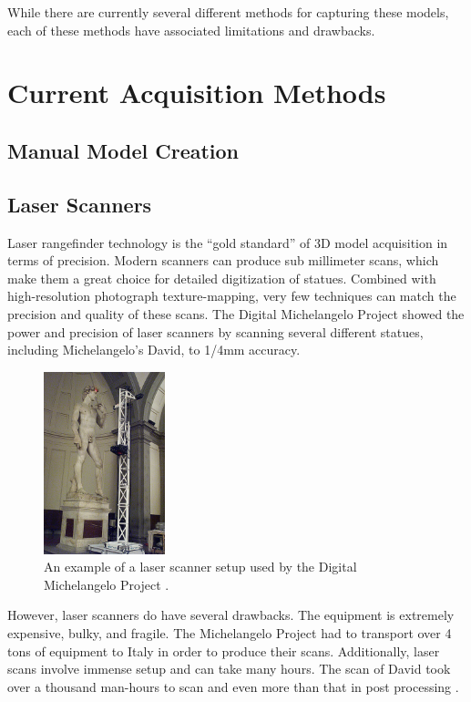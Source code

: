 While there are currently several different methods for capturing these models, each of these methods have associated limitations and drawbacks.


\section{Current Acquisition Methods}

\subsection{Manual Model Creation}

\subsection{Laser Scanners}
Laser rangefinder technology is the ``gold standard'' of 3D model acquisition in terms of precision. Modern scanners can produce sub millimeter scans, which make them a great choice for detailed digitization of statues. Combined with high-resolution photograph texture-mapping, very few techniques can match the precision and quality of these scans. The Digital Michelangelo Project showed the power and precision of laser scanners by scanning several different statues, including Michelangelo's David, to 1/4mm accuracy.\cite{Levoy}

\begin{figure}
\centering
\includegraphics[height=200px]{../images/david_scan.jpg}
\caption{An example of a laser scanner setup used by the Digital Michelangelo Project \cite{Levoy}.}
\end{figure}

However, laser scanners do have several drawbacks. The equipment is extremely expensive, bulky, and fragile. The Michelangelo Project had to transport over 4 tons of equipment to Italy in order to produce their scans. Additionally, laser scans involve immense setup and can take many hours. The scan of David took over a thousand man-hours to scan and even more than that in post processing \cite{Levoy}.


